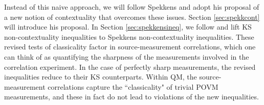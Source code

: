 \begin{itemize}
Instead of this naive approach, we will follow Spekkens and adopt his proposal of a new notion of contextuality \cite{Spekkens2005} that overcomes these issues. Section \ref{sec:spekkcont} will introduce his proposal.
In Section \ref{sec:spekkensineq}, we follow \cite{Kunjwal2019} and lift KS non-contextuality inequalities to Spekkens non-contextuality inequalities. These revised tests of classicality factor in source-measurement correlations, which one can think of as quantifying the sharpness of the measurements involved in the correlation experiment. In the case of perfectly sharp measurements, the revised inequalities reduce to their KS counterparts. Within QM, the source-measurement correlations capture the ``classicality" of trivial POVM measurements, and these in fact do not lead to violations of the new inequalities.
\end{itemize}